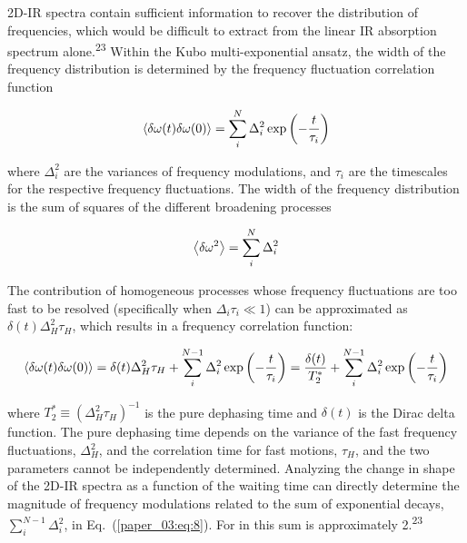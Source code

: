 2D-IR spectra contain sufficient information to recover the distribution of frequencies, which would be difficult to extract from the linear IR absorption spectrum alone.\textsuperscript{23} Within the Kubo multi-exponential ansatz, the width of the frequency distribution is determined by the frequency fluctuation correlation function

\begin{equation}
  \label{paper_03:eq:6}
  \Braket{\delta\omega(t)\delta\omega(0)} = \sum_{i}^{N} \Delta_{i}^{2}\exp\left( - \frac{t}{\tau_{i}} \right)
\end{equation}

where \(\Delta_{i}^{2}\) are the variances of frequency modulations, and \(\tau_{i}\) are the timescales for the respective frequency fluctuations. The width of the frequency distribution is the sum of squares of the different broadening processes

\begin{equation}
  \label{paper_03:eq:7}
  \Braket{\delta\omega^{2}} = \sum_{i}^{N} \Delta_{i}^{2}
\end{equation}

The contribution of homogeneous processes whose frequency fluctuations are too fast to be resolved (specifically when \(\Delta_{i}\tau_{i} \ll 1\)) can be approximated as \(\delta(t)\Delta_{H}^{2}\tau_{H}\), which results in a frequency correlation function:

\begin{equation}
  \label{paper_03:eq:8}
  \Braket{\delta\omega(t)\delta\omega(0)} = \delta(t)\Delta_{H}^{2}\tau_{H} + \sum_{i}^{N - 1}{\Delta_{i}^{2}\exp\left( - \frac{t}{\tau_{i}} \right)} = \frac{\delta(t)}{T_{2}^{*}} + \sum_{i}^{N - 1}{\Delta_{i}^{2}\exp\left( - \frac{t}{\tau_{i}} \right)}
\end{equation}

where \(T_{2}^{*} \equiv \left( \Delta_{H}^{2}\tau_{H} \right)^{- 1}\) is the pure dephasing time and \(\delta(t)\) is the Dirac delta function. The pure dephasing time depends on the variance of the fast frequency fluctuations, \(\Delta_{H}^{2}\), and the correlation time for fast motions, \(\tau_{H}\), and the two parameters cannot be independently determined. Analyzing the change in shape of the 2D-IR spectra as a function of the waiting time can directly determine the magnitude of frequency modulations related to the sum of exponential decays, \(\sum_{i}^{N - 1}\Delta_{i}^{2}\), in Eq.~(\ref{paper_03:eq:8}). For  in \ce{[C4C1im][PF6]} this sum is approximately \SI{2}{\wavenumber}.\textsuperscript{23}

